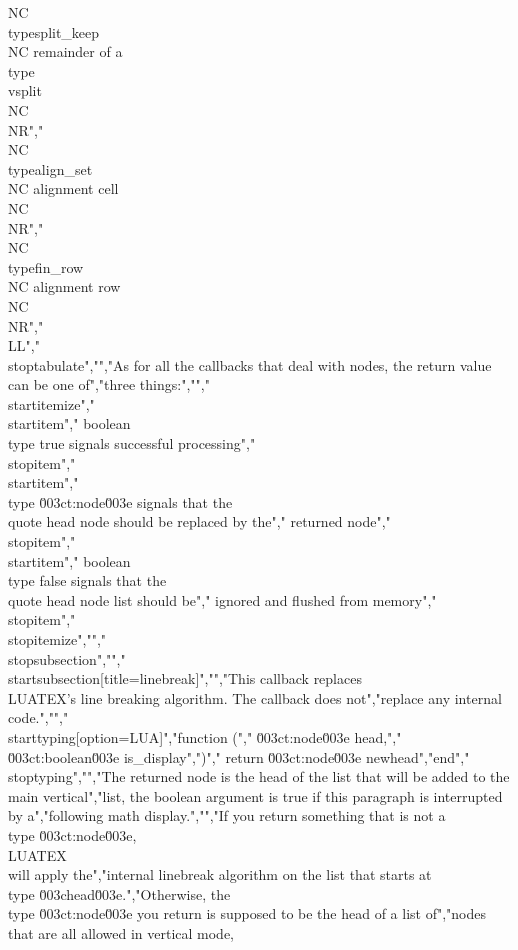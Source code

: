 NC \\type{split_keep}    \\NC remainder of a \\type {\\vsplit}                  \\NC \\NR","\\NC \\type{align_set}     \\NC alignment cell                                  \\NC \\NR","\\NC \\type{fin_row}       \\NC alignment row                                   \\NC \\NR","\\LL","\\stoptabulate","","As for all the callbacks that deal with nodes, the return value can be one of","three things:","","\\startitemize","\\startitem","    boolean \\type {true} signals successful processing","\\stopitem","\\startitem","    \\type {\u003ct:node\u003e} signals that the \\quote {head} node should be replaced by the","    returned node","\\stopitem","\\startitem","    boolean \\type {false} signals that the \\quote {head} node list should be","    ignored and flushed from memory","\\stopitem","\\stopitemize","","\\stopsubsection","","\\startsubsection[title=linebreak]","","This callback replaces \\LUATEX's line breaking algorithm. The callback does not","replace any internal code.","","\\starttyping[option=LUA]","function (","    \u003ct:node\u003e    head,","    \u003ct:boolean\u003e is_display",")","    return \u003ct:node\u003e newhead","end","\\stoptyping","","The returned node is the head of the list that will be added to the main vertical","list, the boolean argument is true if this paragraph is interrupted by a","following math display.","","If you return something that is not a \\type {\u003ct:node\u003e}, \\LUATEX\\ will apply the","internal linebreak algorithm on the list that starts at \\type {\u003chead\u003e}.","Otherwise, the \\type {\u003ct:node\u003e} you return is supposed to be the head of a list of","nodes that are all allowed in vertical mode, 